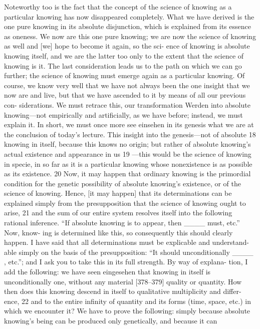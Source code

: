 Noteworthy too is the fact that the concept of the science of knowing
as a particular knowing has now disappeared completely. What we have
derived is the one pure knowing in its absolute disjunction, which is explained
from its essence as oneness. We now are this one pure knowing; we are now
the science of knowing as well and [we] hope to become it again, so the sci-
ence of knowing is absolute knowing itself, and we are the latter too only to
the extent that the science of knowing is it.
The last consideration leads us to the path on which we can go further;
the science of knowing must emerge again as a particular knowing. Of course,
we know very well that we have not always been the one insight that we now
are and live, but that we have ascended to it by means of all our previous con-
siderations. We must retrace this, our transformation {Werden} into absolute
knowing—not empirically and artificially, as we have before; instead, we must
explain it. In short, we must once more see {einsehen} in its genesis what we
are at the conclusion of today’s lecture. This insight into the genesis—not of
absolute 18 knowing in itself, because this knows no origin; but rather of
absolute knowing’s actual existence and appearance in us 19 —this would be the
science of knowing in specie, in so far as it is a particular knowing whose
nonexistence is as possible as its existence. 20
Now, it may happen that ordinary knowing is the primordial condition
for the genetic possibility of absolute knowing’s existence, or of the science of
knowing. Hence, [it may happen] that its determinations can be explained
simply from the presupposition that the science of knowing ought to arise, 21
and the sum of our entire system resolves itself into the following rational
inference. “If absolute knowing is to appear, then ____ must, etc.” Now, know-
ing is determined like this, so consequently this should clearly happen.
I have said that all determinations must be explicable and understand-
able simply on the basis of the presupposition: “It should unconditionally
____ , etc.”; and I ask you to take this in its full strength. By way of explana-
tion, I add the following: we have seen {eingesehen} that knowing in itself is
unconditionally one, without any material [378–379] quality or quantity. How
then does this knowing descend in itself to qualitative multiplicity and differ-
ence, 22 and to the entire infinity of quantity and its forms (time, space, etc.) in
which we encounter it? We have to prove the following: simply because
absolute knowing’s being can be produced only genetically, and because it can
